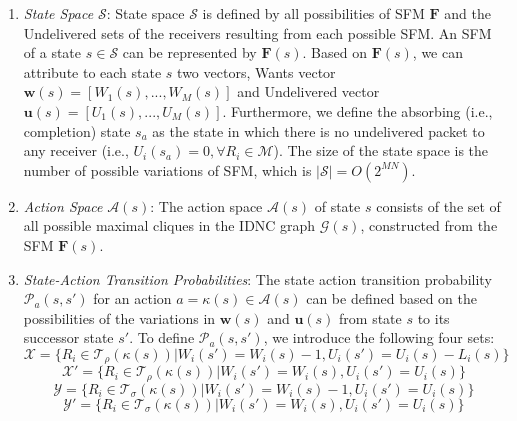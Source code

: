 \documentclass[12pt, peerreview, onecolumn]{IEEEtran}
\begin{document}
\begin{enumerate}
\item \emph{State Space} $\mathcal{S}$: State space $\mathcal{S}$ is  defined by all possibilities of SFM $\mathbf{F}$ and  the Undelivered  sets of the   receivers  resulting from each possible SFM. An SFM of a  state  $s \in \mathcal{S}$ can be represented by  $\mathbf{F}(s)$. Based on  $\mathbf{F}(s)$, we can attribute to  each state $s$   two vectors,  Wants  vector $ \mathbf{w}(s) = [W_1(s),...,W_M(s)]$   and Undelivered vector $\mathbf{u}(s) = [U_1(s),...,U_M(s)]$. Furthermore, we define the  absorbing (i.e., completion)  state $s_a$ as the state in which there is no undelivered packet to any receiver (i.e., $ U_i(s_a) = 0, \forall R_i \in \mathcal{M} $). The size of the  state space is the number of possible variations of SFM, which is $|\mathcal{S}| = O(2^{MN})$.

\item \emph{Action Space} $\mathcal{A}(s)$: The action space $\mathcal{A}(s)$ of  state $s$ consists of the set of  all  possible maximal cliques in the  IDNC graph $\mathcal{G}(s)$, constructed from the SFM $\mathbf{F}(s)$.


\item \emph{State-Action Transition Probabilities}: The state action transition probability $\mathcal{P}_a(s,s')$ for an action $a = \kappa(s) \in \mathcal{A}(s)$ can be defined based on the possibilities of the variations in $\mathbf{w}(s)$ and  $\mathbf{u}(s)$ from state $s$ to its successor state $s'$. To define  $\mathcal{P}_a(s,s')$, we  introduce the following four sets:
    \begin{equation}
    \mathcal{X} = \{ R_i \in \mathcal{T}_{\rho} (\kappa(s))| W_i(s') = W_i(s) -1, U_i(s') = U_i(s) - L_i(s) \}
    \end{equation}
    \begin{equation}
    \mathcal{X}' = \{ R_i \in \mathcal{T}_{\rho} (\kappa(s))|W_i(s') = W_i(s), U_i(s') = U_i(s) \}
    \end{equation}
    \begin{equation}
    \mathcal{Y} = \{ R_i \in \mathcal{T}_{\sigma}(\kappa(s))| W_i(s') = W_i(s) -1 , U_i(s') = U_i(s) \}
    \end{equation}
    \begin{equation}
    \mathcal{Y}' = \{ R_i \in \mathcal{T}_{\sigma}(\kappa(s))| W_i(s') = W_i(s), U_i(s')= U_i(s) \}
    \end{equation}


\end{enumerate}
\end{document}
